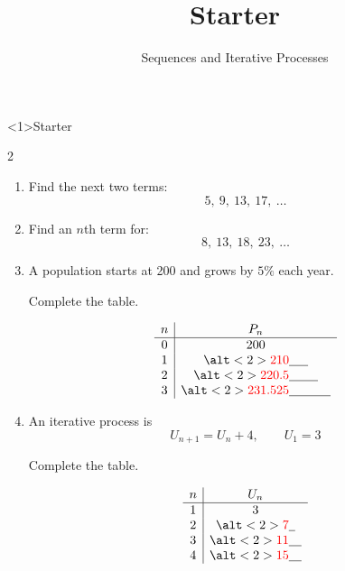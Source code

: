 \documentclass{beamer}
\title{Starter}
\subtitle{Sequences and Iterative Processes}
\newcommand{\ablank}[1]{%
  \alt<2>{\textcolor{red}{#1}}{\underline{\phantom{#1}}}%
}
\newcommand{\ashow}[1]{\uncover<2->{\textcolor{red}{\small #1}}}
\begin{document}
\begin{frame}<1>{Starter}

\small

\begin{multicols}{2}

\begin{enumerate}

\item Find the next two terms:
\[
5,\ 9,\ 13,\ 17,\ \dots
\]

\ashow{$21,\ 25$}

\vspace{0.4cm}

\item Find an $n$th term for:
\[
8,\ 13,\ 18,\ 23,\ \dots
\]

\ashow{$5n+3$}

\vspace{0.4cm}

\item A population starts at 200 and grows by $5\%$ each year.

Complete the table.

\[
\begin{array}{c|c}
n & P_n \\
\hline
0 & 200 \\
1 & \ablank{210} \\
2 & \ablank{220.5} \\
3 & \ablank{231.525}
\end{array}
\]

\vspace{0.2cm}


\vspace{0.4cm}

\item An iterative process is
\[
U_{n+1} = U_n + 4, \qquad U_1 = 3
\]

Complete the table.

\[
\begin{array}{c|c}
n & U_n \\
\hline
1 & 3 \\
2 & \ablank{7} \\
3 & \ablank{11} \\
4 & \ablank{15}
\end{array}
\]

\end{enumerate}

\end{multicols}

\end{frame}
\end{document}
